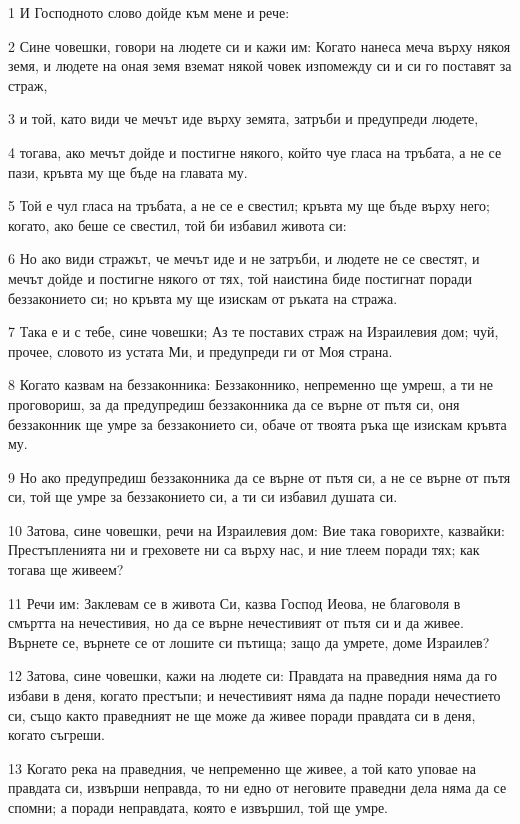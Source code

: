 \par 1 И Господното слово дойде към мене и рече:
\par 2 Сине човешки, говори на людете си и кажи им: Когато нанеса меча върху някоя земя, и людете на оная земя вземат някой човек изпомежду си и си го поставят за страж,
\par 3 и той, като види че мечът иде върху земята, затръби и предупреди людете,
\par 4 тогава, ако мечът дойде и постигне някого, който чуе гласа на тръбата, а не се пази, кръвта му ще бъде на главата му.
\par 5 Той е чул гласа на тръбата, а не се е свестил; кръвта му ще бъде върху него; когато, ако беше се свестил, той би избавил живота си:
\par 6 Но ако види стражът, че мечът иде и не затръби, и людете не се свестят, и мечът дойде и постигне някого от тях, той наистина биде постигнат поради беззаконието си; но кръвта му ще изискам от ръката на стража.
\par 7 Така е и с тебе, сине човешки; Аз те поставих страж на Израилевия дом; чуй, прочее, словото из устата Ми, и предупреди ги от Моя страна.
\par 8 Когато казвам на беззаконника: Беззаконнико, непременно ще умреш, а ти не проговориш, за да предупредиш беззаконника да се върне от пътя си, оня беззаконник ще умре за беззаконието си, обаче от твоята ръка ще изискам кръвта му.
\par 9 Но ако предупредиш беззаконника да се върне от пътя си, а не се върне от пътя си, той ще умре за беззаконието си, а ти си избавил душата си.
\par 10 Затова, сине човешки, речи на Израилевия дом: Вие така говорихте, казвайки: Престъпленията ни и греховете ни са върху нас, и ние тлеем поради тях; как тогава ще живеем?
\par 11 Речи им: Заклевам се в живота Си, казва Господ Иеова, не благоволя в смъртта на нечестивия, но да се върне нечестивият от пътя си и да живее. Върнете се, върнете се от лошите си пътища; защо да умрете, доме Израилев?
\par 12 Затова, сине човешки, кажи на людете си: Правдата на праведния няма да го избави в деня, когато престъпи; и нечестивият няма да падне поради нечестието си, също както праведният не ще може да живее поради правдата си в деня, когато съгреши.
\par 13 Когато река на праведния, че непременно ще живее, а той като уповае на правдата си, извърши неправда, то ни едно от неговите праведни дела няма да се спомни; а поради неправдата, която е извършил, той ще умре.
